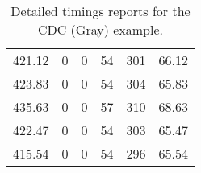 \begin{table}[h]
{\begin{tabular}{cccccc}
            421.12             & 0                         & 0                         & 54                        & 301                       & 66.12                  \\
            423.83             & 0                         & 0                         & 54                        & 304                       & 65.83                  \\
            435.63             & 0                         & 0                         & 57                        & 310                       & 68.63                  \\
            422.47             & 0                         & 0                         & 54                        & 303                       & 65.47                  \\
            415.54             & 0                         & 0                         & 54                        & 296                       & 65.54                  \\
            \bottomrule
        \end{tabular}
    }
    \caption{Detailed timings reports for the CDC (Gray) example.}
\end{table}

